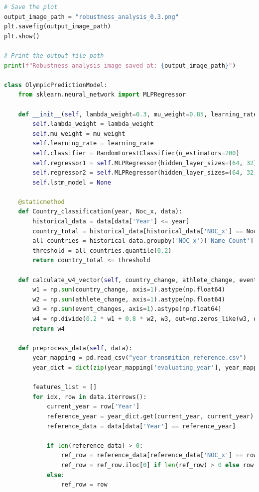 \documentclass[12pt]{article}
\begin{document}
\begin{lstlisting}[language=Python, style=mystyle, caption=model.ipynb]
# Save the plot
output_image_path = "robustness_analysis_0.3.png"
plt.savefig(output_image_path)
plt.show()

# Print the output file path
print(f"Robustness analysis image saved at: {output_image_path}")

class OlympicPredictionModel:
    from sklearn.neural_network import MLPRegressor

    def __init__(self, lambda_weight=0.3, mu_weight=0.85, learning_rate=0.001):
        self.lambda_weight = lambda_weight
        self.mu_weight = mu_weight
        self.learning_rate = learning_rate
        self.classifier = RandomForestClassifier(n_estimators=200)
        self.regressor1 = self.MLPRegressor(hidden_layer_sizes=(64, 32), max_iter=500, random_state=42)
        self.regressor2 = self.MLPRegressor(hidden_layer_sizes=(64, 32), max_iter=500, random_state=42)
        self.lstm_model = None

    @staticmethod
    def Country_classification(year, Noc_x, data):
        historical_data = data[data['Year'] <= year]
        country_total = historical_data[historical_data['NOC_x'] == Noc_x]['Name_Count'].sum()
        all_countries = historical_data.groupby('NOC_x')['Name_Count'].sum()
        threshold = all_countries.quantile(0.2)
        return country_total <= threshold

    def calculate_w4_vector(self, country_change, athlete_change, event_changes):
        w1 = np.sum(country_change, axis=1).astype(np.float64)
        w2 = np.sum(athlete_change, axis=1).astype(np.float64)
        w3 = np.sum(event_changes, axis=1).astype(np.float64)
        w4 = np.divide(0.2 * w1 + 0.8 * w2, w3, out=np.zeros_like(w3, dtype=np.float64), where=w3 != 0)
        return w4

    def preprocess_data(self, data):
        year_mapping = pd.read_csv("year_transmition_reference.csv")
        year_dict = dict(zip(year_mapping['evaluating_year'], year_mapping['use_data_from']))

        features_list = []
        for idx, row in data.iterrows():
            current_year = row['Year']
            reference_year = year_dict.get(current_year, current_year)
            reference_data = data[data['Year'] == reference_year]

            if len(reference_data) > 0:
                ref_row = reference_data[reference_data['NOC_x'] == row['NOC_x']]
                ref_row = ref_row.iloc[0] if len(ref_row) > 0 else row
            else:
                ref_row = row


\end{lstlisting}
\end{document}
